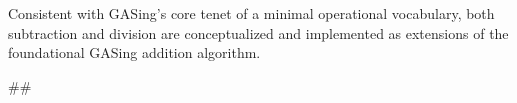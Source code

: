 Consistent with GASing's core tenet of a minimal operational vocabulary, both subtraction and division are conceptualized and implemented as extensions of the foundational GASing addition algorithm.

##

